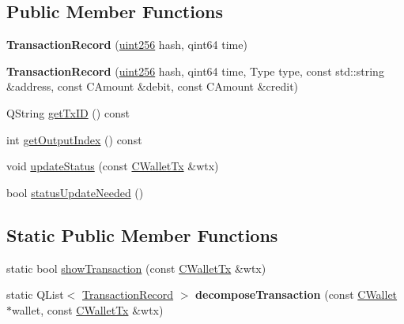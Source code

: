 \subsection*{Public Member Functions}
\begin{DoxyCompactItemize}
\item 
\mbox{\label{class_transaction_record_a2ab5cde606334696dce9a344b530d310}} 
{\bfseries Transaction\+Record} (\mbox{\hyperlink{classuint256}{uint256}} hash, qint64 time)
\item 
\mbox{\label{class_transaction_record_a6c0d484576c37ec753ca225a753535ba}} 
{\bfseries Transaction\+Record} (\mbox{\hyperlink{classuint256}{uint256}} hash, qint64 time, Type type, const std\+::string \&address, const C\+Amount \&debit, const C\+Amount \&credit)
\item 
Q\+String \mbox{\hyperlink{class_transaction_record_a838d881f68f967b751e7f7707bccfffa}{get\+Tx\+ID}} () const
\item 
int \mbox{\hyperlink{class_transaction_record_a51d9d52d92a57448ab9b237e968c5ff6}{get\+Output\+Index}} () const
\item 
void \mbox{\hyperlink{class_transaction_record_a9b643dd885a790ae511705a1446556be}{update\+Status}} (const \mbox{\hyperlink{class_c_wallet_tx}{C\+Wallet\+Tx}} \&wtx)
\item 
bool \mbox{\hyperlink{class_transaction_record_aaca6757b7b300151694021be6af18d11}{status\+Update\+Needed}} ()
\end{DoxyCompactItemize}
\subsection*{Static Public Member Functions}
\begin{DoxyCompactItemize}
\item 
static bool \mbox{\hyperlink{class_transaction_record_a5ad1d1af4bec5b15a624b7a451e8cdbf}{show\+Transaction}} (const \mbox{\hyperlink{class_c_wallet_tx}{C\+Wallet\+Tx}} \&wtx)
\item 
\mbox{\label{class_transaction_record_a9f5db4465fa5fdcc3f9af525096bcdb9}} 
static Q\+List$<$ \mbox{\hyperlink{class_transaction_record}{Transaction\+Record}} $>$ {\bfseries decompose\+Transaction} (const \mbox{\hyperlink{class_c_wallet}{C\+Wallet}} $\ast$wallet, const \mbox{\hyperlink{class_c_wallet_tx}{C\+Wallet\+Tx}} \&wtx)
\end{DoxyCompactItemize}
